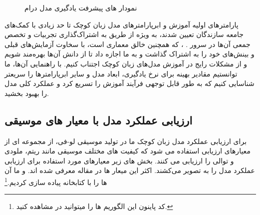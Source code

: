 \begin{figure}
      \centering
      \qquad
      \caption{نمودار های پیشرفت یادگیری مدل درام}
      \label{Fig:lrdr}
\end{figure}

پارامترهای اولیه آموزش و ابرپارامترهای مدل زبان کوچک تا حد زیادی با کمک‌های جامعه سازندگان  تعیین شدند، به ویژه از طریق به اشتراک‌گذاری تجربیات و تخصص جمعی آن‌ها در سرور . ، که همچنین خالق معماری  است، با سخاوت آزمایش‌های قبلی و بینش‌های خود را به اشتراک گذاشت و به ما اجازه داد تا از دانش آن‌ها بهره‌مند شویم و از مشکلات رایج در آموزش مدل‌های زبان کوچک اجتناب کنیم. با راهنمایی آن‌ها، ما توانستیم مقادیر بهینه برای نرخ یادگیری، ابعاد مدل و سایر ابرپارامترها را سریعتر شناسایی کنیم که به طور قابل توجهی فرآیند آموزش را تسریع کرد و عملکرد کلی مدل را بهبود بخشید.

\subsection{ارزیابی عملکرد مدل با معیار های موسیقی}

برای ارزیابی عملکرد مدل زبان کوچک ما در تولید موسیقی لو-فی، از مجموعه ای از معیارهای ارزیابی استفاده می شود که کیفیت های مختلف موسیقی مانند ریتم، ملودی و توالی را ارزیابی می کنند. بخش های زیر معیارهای مورد استفاده برای ارزیابی عملکرد مدل را به تصویر می‌کشند. اکثر این میعار ها در مقاله  \cite{xiong2023comprehensive} معرفی شده اند. و ما آن ها را با کتابخانه  \cite{conf/ismir/CuthbertA10} پیاده سازی کردیم.\footnote{\label{acualCodeRef}کد پاینون این الگوریم ها را میتوانید در  مشاهده کنید.}
